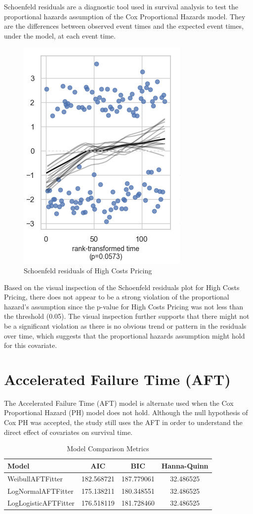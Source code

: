 \documentclass[doublespacing]{report} %
\begin{document}
Schoenfeld residuals are a diagnostic tool used in survival analysis to test the proportional hazards assumption of the Cox Proportional Hazards model. They are the differences between observed event times and the expected event times, under the model, at each event time.

\begin{figure}[H]
    \centering
    \includegraphics[width=0.4\linewidth]{Figure 4/4.3.png}
    \caption{Schoenfeld residuals of High Costs Pricing}
    \label{Figure 4.3}
\end{figure}

Based on the visual inspection of the Schoenfeld residuals plot for High Costs Pricing, there does not appear to be a strong violation of the proportional hazard’s assumption since the p-value for High Costs Pricing was not less than the threshold (0.05). The visual inspection further supports that there might not be a significant violation as there is no obvious trend or pattern in the residuals over time, which suggests that the proportional hazards assumption might hold for this covariate.


\section{Accelerated Failure Time (AFT) }

The Accelerated Failure Time (AFT) model is alternate used when the Cox Proportional Hazard (PH) model does not hold. Although the null hypothesis of Cox PH was accepted, the study still uses the AFT in order to understand the direct effect of covariates on survival time.

\begin{table}[H]
    \centering
    \begin{tabular}{lccc}
        \toprule
        Model & AIC & BIC & Hanna-Quinn \\
        \midrule
        WeibullAFTFitter & 182.568721 & 187.779061 & 32.486525 \\
        LogNormalAFTFitter & 175.138211 & 180.348551 & 32.486525 \\
        LogLogisticAFTFitter & 176.518119 & 181.728460 & 32.486525 \\
        \bottomrule
    \end{tabular}
    \caption{Model Comparison Metrics}
    \label{tab:model_comparison}
\end{table}
\end{document}
